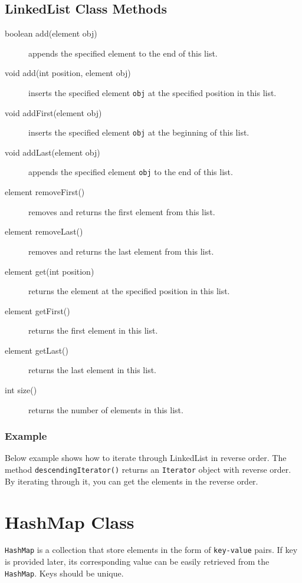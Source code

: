 \documentclass[11pt,a4paper]{article}
\begin{document}
\subsection*{LinkedList Class Methods}
\begin{description}
\item [boolean add(element obj)] appends the specified element to the end of this list.
\item [void add(int position, element obj)] inserts the specified element \texttt{obj} at the specified position in this list.

\item [void addFirst(element obj)] inserts the specified element \texttt{obj} at the beginning of this list.

\item [void addLast(element obj)] appends the specified element \texttt{obj} to the end of this list.

\item [element removeFirst()] removes and returns the first element from this list.

\item [element removeLast()] removes and returns the last element from this list.

\item [element get(int position)] returns the element at the specified position in this list.

\item [element getFirst()] returns the first element in this list.

\item [element getLast()] returns the last element in this list.

\item [int size()] returns the number of elements in this list.
\end{description}
\subsubsection*{Example}
Below example shows how to iterate through LinkedList in reverse order. The method \texttt{descendingIterator()} returns an \texttt{Iterator} object with reverse order. By iterating through it, you can get the elements in the reverse order. 


\section*{HashMap Class}
\texttt{HashMap} is a collection that store elements in the form of \texttt{key-value} pairs. If key is provided later, its corresponding value can be easily retrieved from the \texttt{HashMap}. Keys should be unique. 
\end{document}
